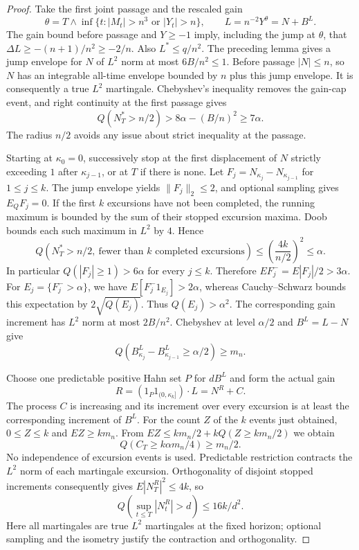 \begin{proof}
Take the first joint passage and the rescaled gain
\[
 \theta=T\wedge\inf\{t:|M_t|>n^3\text{ or }|Y_t|>n\},\qquad
 L=n^{-2}Y^\theta=N+B^L.
\]
The gain bound before passage and $Y\geq-1$ imply, including the jump at
$\theta$, that $\Delta L\geq-(n+1)/n^2\geq-2/n$.
Also $L^*\leq q/n^2$. The preceding lemma gives a jump envelope for $N$
of $L^2$ norm at most $6B/n^2\leq1$.
Before passage $|N|\leq n$, so $N$ has an integrable all-time envelope
bounded by $n$ plus this jump envelope. It is consequently a true
$L^2$ martingale. Chebyshev's inequality removes the gain-cap event, and
right continuity at the first passage gives
\[
 Q(N_T^*>n/2)>8\alpha-(B/n)^2\geq7\alpha.
\]
The radius $n/2$ avoids any issue about strict inequality at the passage.

Starting at $\kappa_0=0$, successively stop at the first displacement of $N$
strictly exceeding $1$ after $\kappa_{j-1}$, or at $T$ if there is none.
Let $F_j=N_{\kappa_j}-N_{\kappa_{j-1}}$ for $1\leq j\leq k$.
The jump envelope yields $\|F_j\|_2\leq2$, and optional sampling gives
$E_QF_j=0$. If the first $k$ excursions have not been completed, the running
maximum is bounded by the sum of their stopped excursion maxima.
Doob bounds each such maximum in $L^2$ by $4$. Hence
\[
 Q(N_T^*>n/2,\ \text{fewer than }k\text{ completed excursions})
 \leq\left(\frac{4k}{n/2}\right)^2\leq\alpha.
\]
In particular $Q(|F_j|\geq1)>6\alpha$ for every $j\leq k$.
Therefore $E F_j^-=E|F_j|/2>3\alpha$.
For $E_j=\{F_j^->\alpha\}$, we have
$E[F_j^-1_{E_j}]>2\alpha$, whereas Cauchy--Schwarz bounds this expectation
by $2\sqrt{Q(E_j)}$. Thus $Q(E_j)>\alpha^2$.
The corresponding gain increment has $L^2$ norm at most $2B/n^2$.
Chebyshev at level $\alpha/2$ and $B^L=L-N$ give
\[
 Q(B^L_{\kappa_j}-B^L_{\kappa_{j-1}}\geq\alpha/2)\geq m_n.
\]

Choose one predictable positive Hahn set $P$ for $dB^L$ and form the
actual gain
\[
 R=(1_P1_{(0,\kappa_k]})\cdot L=N^R+C.
\]
The process $C$ is increasing and its increment over every excursion
is at least the corresponding increment of $B^L$.
For the count $Z$ of the $k$ events just obtained, $0\leq Z\leq k$ and
$EZ\geq km_n$. From
$EZ\leq km_n/2+kQ(Z\geq km_n/2)$ we obtain
\[
 Q(C_T\geq k\alpha m_n/4)\geq m_n/2.
\]
No independence of excursion events is used.
Predictable restriction contracts the $L^2$ norm of each martingale
excursion. Orthogonality of disjoint stopped increments consequently gives
$E|N^R_T|^2\leq4k$, so
\[
 Q\left(\sup_{t\leq T}|N^R_t|>d\right)\leq16k/d^2.
\]
Here all martingales are true $L^2$ martingales at the fixed horizon;
optional sampling and the isometry justify the contraction and orthogonality.


\end{proof}
